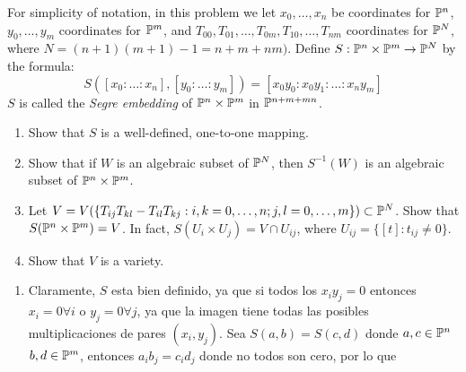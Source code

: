 \begin{prob}{4.28}
    For simplicity of notation, in this problem we let \(x_0,\dots,x_n\) be coordinates for \(\mathbb{P}^n\), \(y_0,\dots,y_m\) coordinates for \(\mathbb{P}^m\), and \(T_{00},T_{01},\dots,T_{0m},T_{10},\dots,T_{nm}\) coordinates for \(\mathbb{P}^N\), where \(N=(n+1)(m+1)-1=n+m+nm)\). Define \(S:\mathbb{P}^n\times\mathbb{P}^m\rightarrow\mathbb{P}^N\) by the formula:
    \[S([x_0:\dots:x_n],[y_0:\dots:y_m])=[x_0y_0:x_0y_1:\dots:x_ny_m]\]
    \(S\) is called the \textit{Segre embedding} of \(\mathbb{P}^n\times\mathbb{P}^m\) in \(\mathbb{P}^{n+m+mn}\).
    \begin{enumerate}
        \item Show that \(S\) is a well-defined, one-to-one mapping.
        \item Show that if \(W\) is an algebraic subset of \(\mathbb{P}^N\), then \(S^{-1}(W)\) is an algebraic subset of \(\mathbb{P}^n\times\mathbb{P}^m\).
        \item Let \(V=V(\{T_{ij}T_{kl}-T_{il}T_{kj}:i,k=0,\dots,n;j,l=0,\dots,m\})\subset\mathbb{P}^N\). Show that \(S(\mathbb{P}^n\times\mathbb{P}^m)=V\). In fact, \(S(U_i\times U_j)=V\cap U_{ij}\), where \(U_{ij}=\{[t]:t_{ij}\neq0\}\).
        \item Show that \(V\) is a variety.
    \end{enumerate}
\end{prob}

\begin{sol}{4.28}
    \begin{enumerate}
        \item Claramente, \(S\) esta bien definido, ya que si todos los \(x_iy_j=0\) entonces \(x_i=0\forall i\) o \(y_j=0\forall j\), ya que la imagen tiene todas las posibles multiplicaciones de pares \((x_i,y_j)\). Sea \(S(a,b)=S(c,d)\) donde \(a,c\in\mathbb{P}^n\) \(b,d\in\mathbb{P}^m\), entonces \(a_ib_j=c_id_j\) donde no todos son cero, por lo que
    \end{enumerate}
\end{sol}

